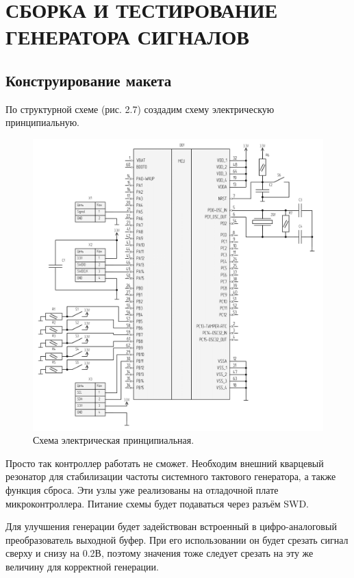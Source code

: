 \chapter{СБОРКА И ТЕСТИРОВАНИЕ ГЕНЕРАТОРА СИГНАЛОВ}
\section{Конструирование макета}
	По структурной схеме (рис. 2.7) создадим схему электрическую принципиальную. 
	
	\begin{figure}[H]
    \centering
    \includegraphics[width=1\textwidth]{../image/scheme-cropped.png}
    \caption{Схема электрическая принципиальная.}
	\end{figure}
	
	Просто так контроллер работать не сможет. Необходим внешний кварцевый резонатор для стабилизации частоты системного тактового генератора, а также функция сброса. Эти узлы уже реализованы на отладочной плате микроконтроллера. Питание схемы будет подаваться через разъём SWD.
		
	Для улучшения генерации будет задействован встроенный в цифро-аналоговый преобразователь выходной буфер. При его использовании он будет срезать сигнал сверху и снизу на 0.2В, поэтому значения тоже следует срезать на эту же величину для корректной генерации.
	
